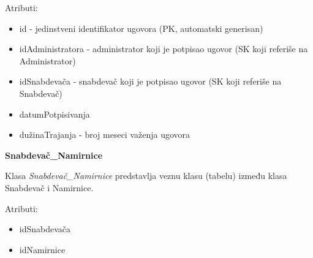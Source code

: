Atributi:
\begin{itemize}
    \item id - jedinstveni identifikator ugovora (PK, automatski generisan)
    \item idAdministratora - administrator koji je potpisao ugovor (SK koji referiše na Administrator)
    \item idSnabdevača - snabdevač koji je potpisao ugovor (SK koji referiše na Snabdevač)
    \item datumPotpisivanja
    \item dužinaTrajanja - broj meseci važenja ugovora
\end{itemize}

\textbf{\large {Snabdevač\_Namirnice}}
\vspace{0.3cm}

Klasa \textit{Snabdevač\_Namirnice} predstavlja veznu klasu (tabelu) između klasa Snabdevač i Namirnice.

Atributi:
\begin{itemize}
    \item idSnabdevača
    \item idNamirnice
\end{itemize}